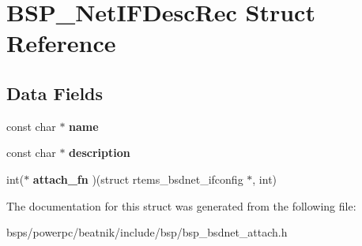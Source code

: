 \hypertarget{structBSP__NetIFDescRec}{}\section{B\+S\+P\+\_\+\+Net\+I\+F\+Desc\+Rec Struct Reference}
\label{structBSP__NetIFDescRec}
\subsection*{Data Fields}
\begin{DoxyCompactItemize}
\item 
\mbox{\label{structBSP__NetIFDescRec_a5ad7f410d5fe460a826a2d223e2a95d6}} 
const char $\ast$ {\bfseries name}
\item 
\mbox{\label{structBSP__NetIFDescRec_ab946fce88543ce9e09baf5bc2a315d91}} 
const char $\ast$ {\bfseries description}
\item 
\mbox{\label{structBSP__NetIFDescRec_a6aaf5f63a5d140b1ea022042f9314433}} 
int($\ast$ {\bfseries attach\+\_\+fn} )(struct rtems\+\_\+bsdnet\+\_\+ifconfig $\ast$, int)
\end{DoxyCompactItemize}


The documentation for this struct was generated from the following file\+:\begin{DoxyCompactItemize}
\item 
bsps/powerpc/beatnik/include/bsp/bsp\+\_\+bsdnet\+\_\+attach.\+h\end{DoxyCompactItemize}
